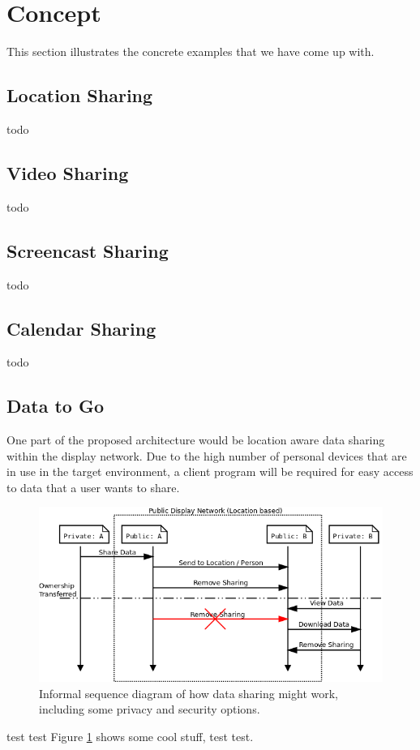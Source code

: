 \section{Concept}

This section illustrates the concrete examples that we have come up with.

\subsection{Location Sharing}

todo

\subsection{Video Sharing}

todo

\subsection{Screencast Sharing}

todo

\subsection{Calendar Sharing}

todo

\subsection{Data to Go}

One part of the proposed architecture would be location aware data sharing within the display network.
Due to the high number of personal devices that are in use in the target environment, a client program will be required for easy access to data that a user wants to share.

\begin{figure}
	\centering
	\includegraphics[width=\linewidth]{img/data_sharing.png}
	\caption[Data Sharing Sequence]{Informal sequence diagram of how data sharing might work, including some privacy and security options.}
	\label{data_share_sequence}
\end{figure}

test test
Figure \ref{data_share_sequence} shows some cool stuff, test test.
